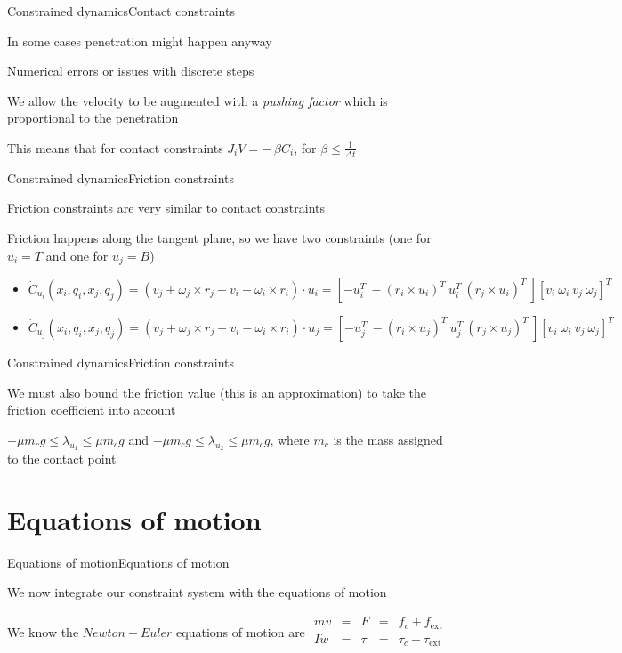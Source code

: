 \documentclass{beamer}
\begin{document}
\begin{slide}{Constrained dynamics}{Contact constraints}{
\item In some cases penetration might happen anyway
\item Numerical errors or issues with discrete steps
\item We allow the velocity to be augmented with a \textit{pushing factor} which is proportional to the penetration
\item This means that for contact constraints $J_i V = -\ \beta C_i$, for $\beta \leq \frac{1}{\Delta t}$
}\end{slide}

\begin{slide}{Constrained dynamics}{Friction constraints}{
\item Friction constraints are very similar to contact constraints
\item Friction happens along the tangent plane, so we have two constraints (one for $u_i = T$ and one for $u_j = B$)
\begin{itemize}
\item $\dot C_{u_i}(x_i,q_i,x_j,q_j) = (v_j + \omega_j \times r_j - v_i - \omega_i \times r_i) \cdot u_i = \left[ -u_i^T\ -(r_i \times u_i)^T\ u_i^T\ (r_j \times u_i)^T\ \right] \left[ v_i\ \omega_i\ v_j\ \omega_j \right]^T$ 
\item $\dot C_{u_j}(x_i,q_i,x_j,q_j) = (v_j + \omega_j \times r_j - v_i - \omega_i \times r_i) \cdot u_j = \left[ -u_j^T\ -(r_i \times u_j)^T\ u_j^T\ (r_j \times u_j)^T\ \right] \left[ v_i\ \omega_i\ v_j\ \omega_j \right]^T$
\end{itemize}
}\end{slide}

\begin{slide}{Constrained dynamics}{Friction constraints}{
\item We must also bound the friction value (this is an approximation) to take the friction coefficient into account
\item $-\mu m_c g \leq \lambda_{u_1} \leq \mu m_c g$ and $-\mu m_c g \leq \lambda_{u_2} \leq \mu m_c g$, where $m_c$ is the mass assigned to the contact point
}\end{slide}

\section{Equations of motion}
\begin{slide}{Equations of motion}{Equations of motion}{
\item We now integrate our constraint system with the equations of motion
\item We know the $Newton-Euler$ equations of motion are 
$\begin{matrix}
m \dot v & = & F & = & f_c + f_{\text{ext}} \\
I \dot w & = & \tau & = & \tau_c + \tau_{\text{ext}} \\
\end{matrix}$
}\end{slide}
\end{document}
